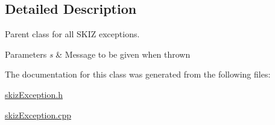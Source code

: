 \subsection{Detailed Description}
Parent class for all S\+K\+IZ exceptions. 


\begin{DoxyParams}{Parameters}
{\em s} & Message to be given when thrown \\
\hline
\end{DoxyParams}


The documentation for this class was generated from the following files\+:\begin{DoxyCompactItemize}
\item 
\mbox{\hyperlink{skizException_8h}{skiz\+Exception.\+h}}\item 
\mbox{\hyperlink{skizException_8cpp}{skiz\+Exception.\+cpp}}\end{DoxyCompactItemize}
